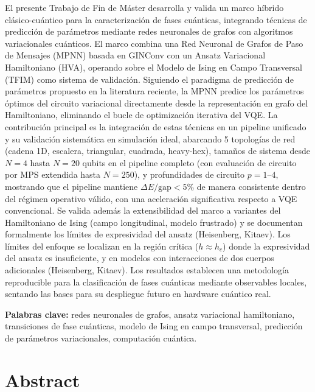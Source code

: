 \documentclass[11pt,a4paper,spanish]{book}
\begin{document}
El presente Trabajo de Fin de Máster desarrolla y valida un marco híbrido clásico-cuántico para la caracterización de fases cuánticas, integrando técnicas de predicción de parámetros mediante redes neuronales de grafos con algoritmos variacionales cuánticos. El marco combina una Red Neuronal de Grafos de Paso de Mensajes (MPNN) basada en GINConv con un Ansatz Variacional Hamiltoniano (HVA), operando sobre el Modelo de Ising en Campo Transversal (TFIM) como sistema de validación. Siguiendo el paradigma de predicción de parámetros propuesto en la literatura reciente, la MPNN predice los parámetros óptimos del circuito variacional directamente desde la representación en grafo del Hamiltoniano, eliminando el bucle de optimización iterativa del VQE. La contribución principal es la integración de estas técnicas en un pipeline unificado y su validación sistemática en simulación ideal, abarcando 5 topologías de red (cadena 1D, escalera, triangular, cuadrada, heavy-hex), tamaños de sistema desde $N=4$ hasta $N=20$ qubits en el pipeline completo (con evaluación de circuito por MPS extendida hasta $N=250$), y profundidades de circuito $p = 1$--$4$, mostrando que el pipeline mantiene $\Delta E/\text{gap} < 5\%$ de manera consistente dentro del régimen operativo válido, con una aceleración significativa respecto a VQE convencional. Se valida además la extensibilidad del marco a variantes del Hamiltoniano de Ising (campo longitudinal, modelo frustrado) y se documentan formalmente los límites de expresividad del ansatz (Heisenberg, Kitaev). Los límites del enfoque se localizan en la región crítica ($h \approx h_c$) donde la expresividad del ansatz es insuficiente, y en modelos con interacciones de dos cuerpos adicionales (Heisenberg, Kitaev). Los resultados establecen una metodología reproducible para la clasificación de fases cuánticas mediante observables locales, sentando las bases para su despliegue futuro en hardware cuántico real.

\vspace{0.5cm}
{\bf Palabras clave:} redes neuronales de grafos, ansatz variacional hamiltoniano, transiciones de fase cuánticas, modelo de Ising en campo transversal, predicción de parámetros variacionales, computación cuántica.

\chapter{Abstract}
\end{document}
